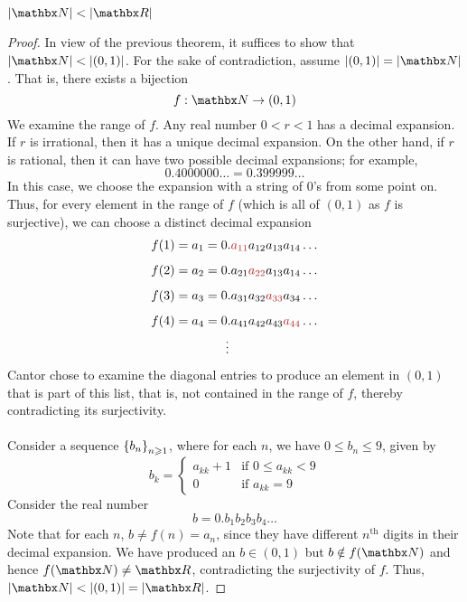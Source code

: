 \vspace*{1em}

\begin{theorem}
$\abs{\nn} < \abs{\rr}$
\end{theorem}
\begin{proof}
In view of the previous theorem, it suffices to show that $\abs{\nn} < \abs{(0,1)}$. For the sake of contradiction, assume $\abs{(0,1)} = \abs{\nn}$. That is, there exists a bijection
\[f:\nn \to (0,1)\]\newpage
We examine the range of $f$. Any real number $0 < r < 1$ has a decimal expansion. If $r$ is irrational, then it has a unique decimal expansion. On the other hand, if $r$ is rational, then it can have two possible decimal expansions; for example,
\[0.4000000\ldots = 0.399999\ldots\]
In this case, we choose the expansion with a string of $0$'s from some point on. Thus, for every element in the range of $f$ (which is all of $(0,1)$ as $f$ is surjective), we can choose a distinct decimal expansion
\begin{align*}
f(1) &= a_1 = 0.{\color{firebrick}a_{11}}a_{12}a_{13}a_{14}\ldots\\[0.5em]
f(2) &= a_2 = 0.a_{21}{\color{firebrick}a_{22}}a_{13}a_{14}\ldots\\[0.5em]
f(3) &= a_3 = 0.a_{31}a_{32}{\color{firebrick}a_{33}}a_{34}\ldots\\[0.5em]
f(4) &= a_4 = 0.a_{41}a_{42}a_{43}{\color{firebrick}a_{44}}\ldots\\
	 & \qquad\qquad\vdots
\end{align*}
Cantor chose to examine the diagonal entries to produce an element in $(0,1)$ that is part of this list, that is, not contained in the range of $f$, thereby contradicting its surjectivity.\\
\\
Consider a sequence $\left\{b_n\right\}_{n \geqslant 1}$, where for each $n$, we have $0 \leq b_n \leq 9$, given by 
\[b_k = \begin{cases}
a_{kk} + 1 & \text{if $0 \leq a_{kk} < 9$}\\[0.5em]
0 & \text{if $a_{kk} = 9$}
\end{cases}\]
Consider the real number
\[b = 0.b_1b_2b_3b_4\ldots\]
Note that for each $n$, $b \neq f(n) = a_n$, since they have different $n^{\text{th}}$ digits in their decimal expansion. We have produced an $b \in (0,1)$ but $b \notin f(\nn)$ and hence $f(\nn) \neq \rr$, contradicting the surjectivity of $f$. Thus, $\abs{\nn} < \abs{(0,1)} = \abs{\rr}$.
\end{proof}